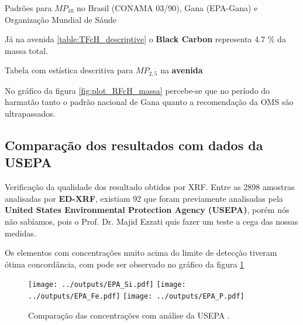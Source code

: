 \begin{table}[H]
  \centering
  \begin{scriptsize}
    
  \end{scriptsize}
  \caption{Padrões para $MP_{10}$ no Brasil (CONAMA 03/90), Gana (EPA-Gana) e 
          Organização Mundial de Sáude \label{table:pm10standards}}
\end{table}



Já na avenida \ref{table:TFcH_descriptive} o \textbf{Black Carbon} 
representa 4.7 \% da massa total.

\begin{table}[H]
  \centering
  \begin{scriptsize}
    
  \end{scriptsize}
  \caption{Tabela com estística descritiva para $MP_{2,5}$ na \textbf{avenida}
          \label{table:TFcH_descriptive}}
\end{table}

No gráfico da figura \ref{fig:plot_RFcH_massa} percebe-se que no período 
do harmatão tanto o padrão nacional de Gana quanto a recomendação da OMS 
são ultrapassados.


\subsection{Comparação dos resultados com dados da USEPA}

Verificação da qualidade dos resultado obtidos por XRF.
Entre as 2898 amostras analisadas por \textbf{ED-XRF}, existiam 92 que foram 
previamente analisadas pela \textbf{United States Environmental Protection 
Agency (USEPA)}, porém nós não sabíamos, pois o Prof. Dr. Majid Ezzati quis 
fazer um teste a cega das nossas medidas. 

Os elementos com concentrações muito acima do limite de detecção tiveram ótima
concordância, com pode ser observado no gráfico da figura \ref{fig:epa} 

\begin{figure}[H]
  \centering
    \texttt{[image: ../outputs/EPA\_Si.pdf]}
    \texttt{[image: ../outputs/EPA\_Fe.pdf]}
    \texttt{[image: ../outputs/EPA\_P.pdf]}
  \caption{Comparação das concentrações com análise da USEPA \label{fig:epa}.}
\end{figure}
